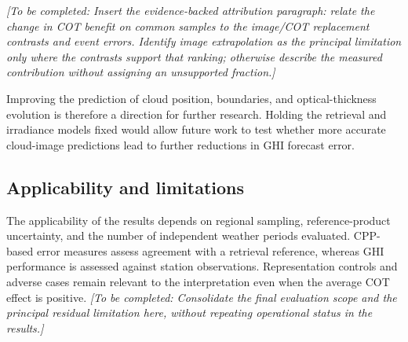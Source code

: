 \documentclass[11pt]{article}
\newcommand{\pending}[1]{{\color{pendingcolor}\textit{[To be completed: #1]}}}
\begin{document}
\pending{Insert the evidence-backed attribution paragraph: relate the change in COT benefit on common samples to the image/COT replacement contrasts and event errors. Identify image extrapolation as the principal limitation only where the contrasts support that ranking; otherwise describe the measured contribution without assigning an unsupported fraction.}

Improving the prediction of cloud position, boundaries, and optical-thickness evolution is therefore a direction for further research. Holding the retrieval and irradiance models fixed would allow future work to test whether more accurate cloud-image predictions lead to further reductions in GHI forecast error.

\FloatBarrier
\subsection{Applicability and limitations}
The applicability of the results depends on regional sampling, reference-product uncertainty, and the number of independent weather periods evaluated. CPP-based error measures assess agreement with a retrieval reference, whereas GHI performance is assessed against station observations. Representation controls and adverse cases remain relevant to the interpretation even when the average COT effect is positive. \pending{Consolidate the final evaluation scope and the principal residual limitation here, without repeating operational status in the results.}
\end{document}
